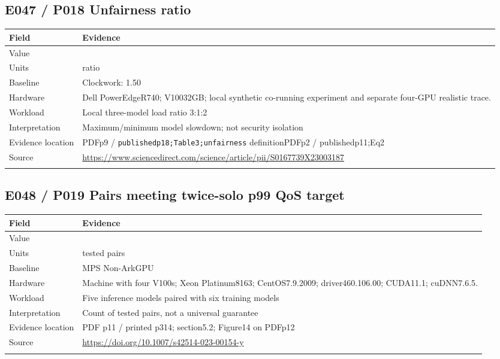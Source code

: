 \subsection*{E047 / P018 Unfairness ratio}

\begin{longtable}{>{\raggedright\arraybackslash}p{}>{\raggedright\arraybackslash}p{}}
\toprule
\textbf{Field} & \textbf{Evidence}\\\midrule\endhead
Value & 1.05\\\addlinespace
Units & ratio\\\addlinespace
Baseline & Clockwork: 1.50\\\addlinespace
Hardware & Dell PowerEdgeR740; V10032GB; local synthetic co-running experiment and separate four-GPU realistic trace.\\\addlinespace
Workload & Local three-model load ratio 3:1:2\\\addlinespace
Interpretation & Maximum/minimum model slowdown; not security isolation\\\addlinespace
Evidence location & PDFp9 / \nolinkurl{publishedp18;Table3;unfairness} definitionPDFp2 / publishedp11;Eq2\\\addlinespace
Source & \url{https://www.sciencedirect.com/science/article/pii/S0167739X23003187}\\\addlinespace
\bottomrule\end{longtable}

\subsection*{E048 / P019 Pairs meeting twice-solo p99 QoS target}

\begin{longtable}{>{\raggedright\arraybackslash}p{}>{\raggedright\arraybackslash}p{}}
\toprule
\textbf{Field} & \textbf{Evidence}\\\midrule\endhead
Value & 30\\\addlinespace
Units & tested pairs\\\addlinespace
Baseline & MPS Non-ArkGPU\\\addlinespace
Hardware & Machine with four V100s; Xeon Platinum8163; CentOS7.9.2009; driver460.106.00; CUDA11.1; cuDNN7.6.5.\\\addlinespace
Workload & Five inference models paired with six training models\\\addlinespace
Interpretation & Count of tested pairs, not a universal guarantee\\\addlinespace
Evidence location & PDF p11 / printed p314; section5.2; Figure14 on PDFp12\\\addlinespace
Source & \url{https://doi.org/10.1007/s42514-023-00154-y}\\\addlinespace
\bottomrule\end{longtable}

